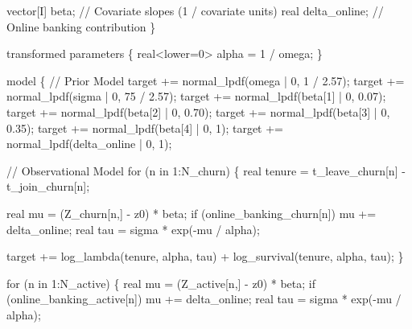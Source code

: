 \documentclass[
  letterpaper,
  DIV=11,
  numbers=noendperiod]{scrartcl}
\newenvironment{Shaded}{\begin{snugshade}}{\end{snugshade}}
\newcommand{\CommentTok}[1]{\textcolor[rgb]{0.37,0.37,0.37}{#1}}
\newcommand{\ControlFlowTok}[1]{\textcolor[rgb]{0.00,0.23,0.31}{#1}}
\newcommand{\DataTypeTok}[1]{\textcolor[rgb]{0.68,0.00,0.00}{#1}}
\newcommand{\DecValTok}[1]{\textcolor[rgb]{0.68,0.00,0.00}{#1}}
\newcommand{\FloatTok}[1]{\textcolor[rgb]{0.68,0.00,0.00}{#1}}
\newcommand{\KeywordTok}[1]{\textcolor[rgb]{0.00,0.23,0.31}{#1}}
\newcommand{\NormalTok}[1]{\textcolor[rgb]{0.00,0.23,0.31}{#1}}
\begin{document}
\begin{codelisting}
\begin{Shaded}
\begin{Highlighting}[]
  \DataTypeTok{vector}\NormalTok{[I] beta;    }\CommentTok{// Covariate slopes (1 / covariate units)}
  \DataTypeTok{real}\NormalTok{ delta\_online; }\CommentTok{// Online banking contribution}
\NormalTok{\}}

\KeywordTok{transformed parameters}\NormalTok{ \{}
  \DataTypeTok{real}\NormalTok{\textless{}}\KeywordTok{lower}\NormalTok{=}\DecValTok{0}\NormalTok{\textgreater{} alpha = }\DecValTok{1}\NormalTok{ / omega;}
\NormalTok{\}}

\KeywordTok{model}\NormalTok{ \{}
  \CommentTok{// Prior Model}
  \KeywordTok{target +=}\NormalTok{ normal\_lpdf(omega | }\DecValTok{0}\NormalTok{, }\DecValTok{1}\NormalTok{ / }\FloatTok{2.57}\NormalTok{);}
  \KeywordTok{target +=}\NormalTok{ normal\_lpdf(sigma | }\DecValTok{0}\NormalTok{, }\DecValTok{75}\NormalTok{ / }\FloatTok{2.57}\NormalTok{);}
  \KeywordTok{target +=}\NormalTok{ normal\_lpdf(beta[}\DecValTok{1}\NormalTok{] | }\DecValTok{0}\NormalTok{, }\FloatTok{0.07}\NormalTok{);}
  \KeywordTok{target +=}\NormalTok{ normal\_lpdf(beta[}\DecValTok{2}\NormalTok{] | }\DecValTok{0}\NormalTok{, }\FloatTok{0.70}\NormalTok{);}
  \KeywordTok{target +=}\NormalTok{ normal\_lpdf(beta[}\DecValTok{3}\NormalTok{] | }\DecValTok{0}\NormalTok{, }\FloatTok{0.35}\NormalTok{);}
  \KeywordTok{target +=}\NormalTok{ normal\_lpdf(beta[}\DecValTok{4}\NormalTok{] | }\DecValTok{0}\NormalTok{, }\DecValTok{1}\NormalTok{);}
  \KeywordTok{target +=}\NormalTok{ normal\_lpdf(delta\_online | }\DecValTok{0}\NormalTok{, }\DecValTok{1}\NormalTok{);}

  \CommentTok{// Observational Model}
  \ControlFlowTok{for}\NormalTok{ (n }\ControlFlowTok{in} \DecValTok{1}\NormalTok{:N\_churn) \{}
    \DataTypeTok{real}\NormalTok{ tenure = t\_leave\_churn[n] {-} t\_join\_churn[n];}

    \DataTypeTok{real}\NormalTok{ mu = (Z\_churn[n,] {-} z0) * beta;}
    \ControlFlowTok{if}\NormalTok{ (online\_banking\_churn[n])}
\NormalTok{      mu += delta\_online;}
    \DataTypeTok{real}\NormalTok{ tau = sigma * exp({-}mu / alpha);}

    \KeywordTok{target +=}\NormalTok{   log\_lambda(tenure, alpha, tau)}
\NormalTok{              + log\_survival(tenure, alpha, tau);}
\NormalTok{  \}}

  \ControlFlowTok{for}\NormalTok{ (n }\ControlFlowTok{in} \DecValTok{1}\NormalTok{:N\_active) \{}
    \DataTypeTok{real}\NormalTok{ mu = (Z\_active[n,] {-} z0) * beta;}
    \ControlFlowTok{if}\NormalTok{ (online\_banking\_active[n])}
\NormalTok{      mu += delta\_online;}
    \DataTypeTok{real}\NormalTok{ tau = sigma * exp({-}mu / alpha);}


\end{Highlighting}
\end{Shaded}
\end{codelisting}
\end{document}
